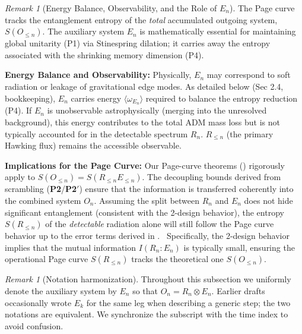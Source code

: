\documentclass[aps,prd,preprint,onecolumn,superscriptaddress,nofootinbib,longbibliography,floatfix,11pt,showpacs,showkeys]{revtex4-2}
\newcommand{\Ptwo}{\textbf{P2}\xspace}
\newcommand{\PtwoPrime}{\textbf{P2$'$}\xspace}
\theoremstyle{plain}
\theoremstyle{definition}
\theoremstyle{remark}
\newtheorem{remark}[theorem]{Remark}
\begin{document}
\begin{remark}[Energy Balance, Observability, and the Role of $E_n$]\label{rem:entropy_target_E_n}
The Page curve tracks the entanglement entropy of the \emph{total} accumulated outgoing system, $S(O_{\le n})$. The auxiliary system $E_n$ is mathematically essential for maintaining global unitarity (P1) via Stinespring dilation; it carries away the entropy associated with the shrinking memory dimension (P4).

\textbf{Energy Balance and Observability:} Physically, $E_n$ may correspond to soft radiation or leakage of gravitational edge modes. As detailed below (Sec 2.4, bookkeeping), $E_n$ carries energy $\langle \omega_{E_{n}}\rangle$ required to balance the entropy reduction (P4). If $E_n$ is unobservable astrophysically (merging into the unresolved background), this energy contributes to the total ADM mass loss but is not typically accounted for in the detectable spectrum $R_n$. $R_{\le n}$ (the primary Hawking flux) remains the accessible observable.

\textbf{Implications for the Page Curve:} Our Page-curve theorems () rigorously apply to $S(O_{\le n})=S(R_{\le n}E_{\le n})$. The decoupling bounds derived from scrambling (\Ptwo/\PtwoPrime) ensure that the information is transferred coherently into the combined system $O_n$. Assuming the split between $R_n$ and $E_n$ does not hide significant entanglement (consistent with the 2-design behavior), the entropy $S(R_{\le n})$ of the \emph{detectable} radiation alone will still follow the Page curve behavior up to the error terms derived in .
\ Specifically, the 2-design behavior implies that the mutual information $I(R_n:E_n)$ is typically small, ensuring the operational Page curve $S(R_{\le n})$ tracks the theoretical one $S(O_{\le n})$.
\end{remark}

\begin{remark}[Notation harmonization]
Throughout this subsection we uniformly denote the auxiliary system by $E_n$ so that
$O_n=R_n\otimes E_n$.
Earlier drafts occasionally wrote $E_k$ for the same leg when describing a generic step;
the two notations are equivalent. We synchronize the subscript with the time index to
avoid confusion.
\end{remark}
\end{document}
